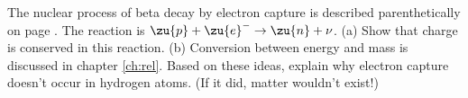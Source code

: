         The nuclear process of beta decay by electron capture
        is described parenthetically on page \pageref{electroncapture}. The reaction is
        $\zu{p}+\zu{e}^- \rightarrow \zu{n}+\nu$.\hwendpart
        (a) Show that charge is conserved in this
        reaction. \hwendpart
        (b) Conversion between energy and mass is
        discussed in chapter \ref{ch:rel}. Based on
        these ideas, explain why electron capture doesn't occur in
        hydrogen atoms. (If it did, matter wouldn't exist!)

